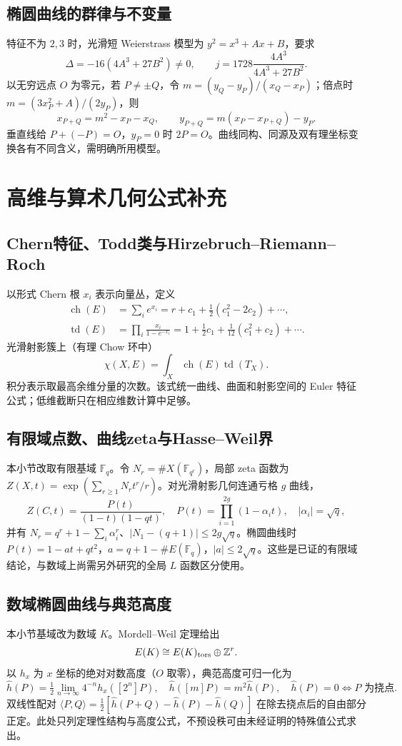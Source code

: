 \documentclass[../main.tex]{subfiles}
\begin{document}
\subsection{椭圆曲线的群律与不变量}
特征不为 $2,3$ 时，光滑短 Weierstrass 模型为 $y^2=x^3+Ax+B$，要求
\[
\Delta=-16(4A^3+27B^2)\ne0,\qquad
j=1728\frac{4A^3}{4A^3+27B^2}.
\]
以无穷远点 $O$ 为零元，若 $P\ne\pm Q$，令 $m=(y_Q-y_P)/(x_Q-x_P)$；倍点时 $m=(3x_P^2+A)/(2y_P)$，则
\[
x_{P+Q}=m^2-x_P-x_Q,\qquad y_{P+Q}=m(x_P-x_{P+Q})-y_P.
\]
垂直线给 $P+(-P)=O$，$y_P=0$ 时 $2P=O$。曲线同构、同源及双有理坐标变换各有不同含义，需明确所用模型。
\section{高维与算术几何公式补充}
\subsection{Chern特征、Todd类与Hirzebruch--Riemann--Roch}
以形式 Chern 根 $x_i$ 表示向量丛，定义
\begin{align*}
\operatorname{ch}(E)&=\sum_i e^{x_i}=r+c_1+\tfrac12(c_1^2-2c_2)+\cdots,\\
\operatorname{td}(E)&=\prod_i\frac{x_i}{1-e^{-x_i}}
=1+\tfrac12c_1+\tfrac1{12}(c_1^2+c_2)+\cdots.
\end{align*}
光滑射影簇上（有理 Chow 环中）
\[
\chi(X,E)=\int_X\operatorname{ch}(E)\operatorname{td}(T_X).
\]
积分表示取最高余维分量的次数。该式统一曲线、曲面和射影空间的 Euler 特征公式；低维截断只在相应维数计算中足够。
\subsection{有限域点数、曲线zeta与Hasse--Weil界}
本小节改取有限基域 $\mathbb F_q$。令 $N_r=\#X(\mathbb F_{q^r})$，局部 zeta 函数为 $Z(X,t)=\exp(\sum_{r\ge1}N_rt^r/r)$。对光滑射影几何连通亏格 $g$ 曲线，
\[
Z(C,t)=\frac{P(t)}{(1-t)(1-qt)},\quad
P(t)=\prod_{i=1}^{2g}(1-\alpha_it),\quad|\alpha_i|=\sqrt q,
\]
并有 $N_r=q^r+1-\sum_i\alpha_i^r$、$|N_1-(q+1)|\le2g\sqrt q$。椭圆曲线时 $P(t)=1-at+qt^2$，$a=q+1-\#E(\mathbb F_q)$，$|a|\le2\sqrt q$。这些是已证的有限域结论，与数域上尚需另外研究的全局 $L$ 函数区分使用。
\subsection{数域椭圆曲线与典范高度}
本小节基域改为数域 $K$。Mordell--Weil 定理给出
\[
E(K)\cong E(K)_{\rm tors}\oplus\mathbb Z^r.
\]
以 $h_x$ 为 $x$ 坐标的绝对对数高度（$O$ 取零），典范高度可归一化为
\[
\widehat h(P)=\tfrac12\lim_{n\to\infty}4^{-n}h_x([2^n]P),\quad
\widehat h([m]P)=m^2\widehat h(P),\quad
\widehat h(P)=0\iff P\text{ 为挠点}.
\]
双线性配对 $\langle P,Q\rangle=\tfrac12[\widehat h(P+Q)-\widehat h(P)-\widehat h(Q)]$ 在除去挠点后的自由部分正定。此处只列定理性结构与高度公式，不预设秩可由未经证明的特殊值公式求出。
\end{document}
